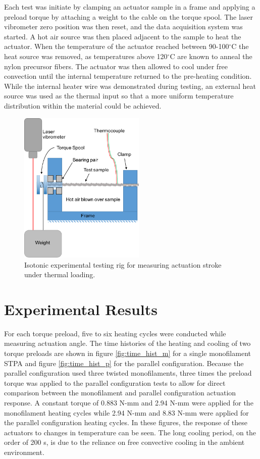\documentclass[twocolumn,10pt]{asme2e}
\begin{document}
Each test was initiate by clamping an actuator sample in a frame and applying a preload torque by attaching a weight to the cable on the torque spool. The laser vibrometer zero position was then reset, and the data acquisition system was started. A hot air source was then placed adjacent to the sample to heat the actuator. When the temperature of the actuator reached between 90-100$^\circ$C the heat source was removed, as temperatures above 120$^\circ$C are known to anneal the nylon precursor fibers. The actuator was then allowed to cool under free convection until the internal temperature returned to the pre-heating condition. While the internal heater wire was demonstrated during testing, an external heat source was used as the thermal input so that a more uniform temperature distribution within the material could be achieved. 

\begin{figure}
    \centering
        \includegraphics[width=6cm]{../Images/experimental_setup.pdf}
        \caption{Isotonic experimental testing rig for measuring actuation stroke under thermal loading.}
        \label{fig:setup}
\end{figure}

\section{Experimental Results}
For each torque preload, five to six heating cycles were conducted while measuring actuation angle.  The time histories of the heating and cooling of two torque preloads are shown in figure \ref{fig:time_hist_m} for a single monofilament STPA and figure \ref{fig:time_hist_p} for the parallel configuration. Because the parallel configuration used three twisted monofilaments, three times the preload torque was applied to the parallel configuration tests to allow for direct comparison between the monofilament and parallel configuration actuation response. A constant torque of 0.883 N-mm and 2.94 N-mm were applied for the monofilament heating cycles while 2.94 N-mm and 8.83 N-mm were applied for the parallel configuration heating cycles. In these figures, the response of these actuators to changes in temperature can be seen. The long cooling period, on the order of 200 s, is due to the reliance on free convective cooling in the ambient environment.
\end{document}
